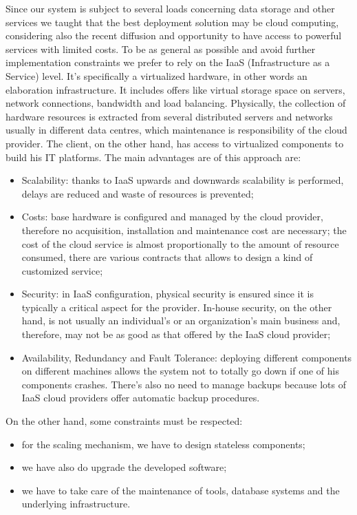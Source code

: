 Since our system is subject to several loads concerning data storage and other services we taught that the best deployment solution may be cloud computing, considering also the recent diffusion and opportunity to have access to powerful services with limited costs. 
To be as general as possible and avoid further implementation constraints we prefer to rely on the
IaaS (Infrastructure as a Service) level. It’s specifically a virtualized hardware, in other words an elaboration infrastructure. It includes offers like virtual storage space on servers, network connections, bandwidth and load balancing. Physically, the collection of hardware resources is extracted from several distributed servers and networks usually in different data centres, which maintenance is responsibility of the cloud provider. 
The client, on the other hand, has access to virtualized components to build his IT platforms.
The main advantages are of this approach are:
\begin{itemize}

\item	Scalability: thanks to IaaS upwards and downwards scalability is performed, delays are reduced and waste of resources is prevented;
\item	Costs: base hardware is configured and managed by the cloud provider, therefore no acquisition, installation and maintenance cost are necessary; the cost of the cloud service is almost proportionally to the amount of resource consumed, there are various contracts that allows to design a kind of customized service;
\item	Security: in IaaS configuration, physical security is ensured since it is typically a critical aspect for the provider. In-house security, on the other hand, is not usually an individual’s or an organization’s main business and, therefore, may not be as good as that offered by the IaaS cloud provider;
\item	Availability, Redundancy and Fault Tolerance: deploying different components on different machines allows the system not to totally go down if one of his components crashes. There’s also no need to manage backups because lots of IaaS cloud providers offer automatic backup procedures.
\end{itemize}

On the other hand, some constraints must be respected:
\begin{itemize}
\item	for the scaling mechanism, we have to design stateless components;
\item	we have also do upgrade the developed software;
\item	we have to take care of the maintenance of tools, database systems and the underlying infrastructure.
\end{itemize}
%
%
